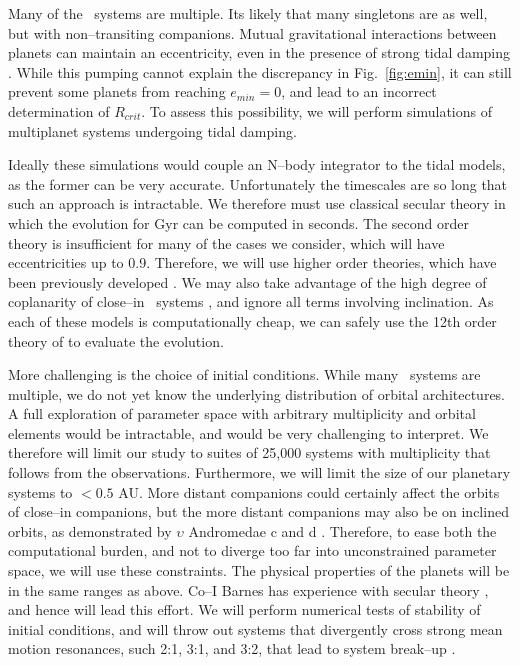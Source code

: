 Many of the \kepler~systems are multiple.  Its likely that many
singletons are as well, but with non--transiting companions.  Mutual
gravitational interactions between planets can maintain an
eccentricity, even in the presence of strong tidal damping
\citep{AdamsLaughlin05,Correia12,vanLaerhovenGreenberg13}.  While this
pumping cannot explain the discrepancy in Fig.~\ref{fig:emin}, it can
still prevent some planets from reaching $e_{min} = 0$, and lead to an
incorrect determination of $R_{crit}$.  To assess this possibility, we
will perform simulations of multiplanet systems undergoing tidal
damping.

Ideally these simulations would couple an N--body integrator to the
tidal models, as the former can be very accurate.  Unfortunately the
timescales are so long that such an approach is intractable.  We
therefore must use classical secular theory in which the evolution for
Gyr can be computed in seconds.  The second order theory is
insufficient for many of the cases we consider, which will have
eccentricities up to 0.9.  Therefore, we will use higher order
theories, which have been previously developed
\citep[e.g.][]{Ford01,VerasArmitage04,LibertHenrard06}.  We may also
take advantage of the high degree of coplanarity of close--in
\kepler~systems \cite{Fabrycky10}, and ignore all terms involving
inclination.  As each of these models is computationally cheap, we can
safely use the 12th order theory of \cite{LibertHenrard} to evaluate
the evolution.  

More challenging is the choice of initial conditions.  While many
\kepler~systems are multiple, we do not yet know the underlying
distribution of orbital architectures.  A full exploration of
parameter space with arbitrary multiplicity and orbital elements would
be intractable, and would be very challenging to interpret.  We
therefore will limit our study to suites of 25,000 systems with
multiplicity that follows from the observations.  Furthermore, we will
limit the size of our planetary systems to $<0.5$ AU.  More distant
companions could certainly affect the orbits of close--in companions,
but the more distant companions may also be on inclined orbits, as
demonstrated by $\upsilon$ Andromedae c and d
\citep{McArthur10,ReffertQuirrenbach11}.  Therefore, to ease both the
computational burden, and not to diverge too far into unconstrained
parameter space, we will use these constraints.  The physical
properties of the planets will be in the same ranges as above.  Co--I
Barnes has experience with secular theory
\citep{BarnesGreenberg06a,BarnesGreenberg06b}, and hence will lead
this effort.  We will perform numerical tests of stability of initial
conditions, and will throw out systems that divergently cross strong
mean motion resonances, such 2:1, 3:1, and 3:2, that lead to system
break--up \citep[e.g.][]{Gomes05}.

